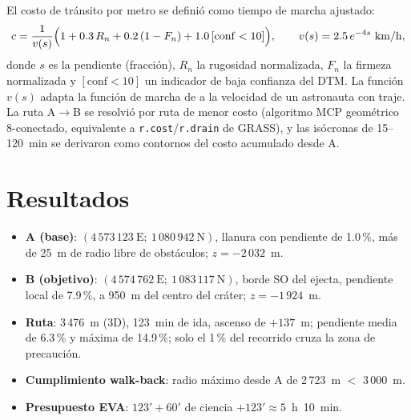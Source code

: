 \documentclass{article}
\begin{document}
El costo de tránsito por metro se definió como tiempo de marcha ajustado:
\begin{equation}
c = \frac{1}{v(s)}\Bigl(1 + 0.3\,R_n + 0.2\,(1-F_n) + 1.0\,[\mathrm{conf}<10]\Bigr),
\qquad v(s) = 2.5\,e^{-4s}~\text{km/h},
\label{eq:costo}
\end{equation}
donde $s$ es la pendiente (fracción), $R_n$ la rugosidad normalizada, $F_n$ la firmeza normalizada y $[\mathrm{conf}<10]$ un indicador de baja confianza del DTM. La función $v(s)$ adapta la función de marcha de \citet{tobler1993} a la velocidad de un astronauta con traje. La ruta A$\to$B se resolvió por ruta de menor costo (algoritmo MCP geométrico 8-conectado, equivalente a \texttt{r.cost}/\texttt{r.drain} de GRASS), y las isócronas de 15--120~min se derivaron como contornos del costo acumulado desde A.

\newpage

\section{Resultados}

\begin{itemize}
    \item \textbf{A (base)}: $(4\,573\,123~\mathrm{E};\ 1\,080\,942~\mathrm{N})$, llanura con pendiente de 1.0\,\%, más de 25~m de radio libre de obstáculos; $z = -2\,032$~m.
    \item \textbf{B (objetivo)}: $(4\,574\,762~\mathrm{E};\ 1\,083\,117~\mathrm{N})$, borde SO del ejecta, pendiente local de 7.9\,\%, a 950~m del centro del cráter; $z = -1\,924$~m.
    \item \textbf{Ruta}: 3\,476~m (3D), 123~min de ida, ascenso de $+137$~m; pendiente media de 6.3\,\% y máxima de 14.9\,\%; solo el 1\,\% del recorrido cruza la zona de precaución.
    \item \textbf{Cumplimiento walk-back}: radio máximo desde A de 2\,723~m $<$ 3\,000~m.
    \item \textbf{Presupuesto EVA}: $123' + 60'$ de ciencia $+ 123' \approx 5$~h~10~min.
\end{itemize}
\end{document}
